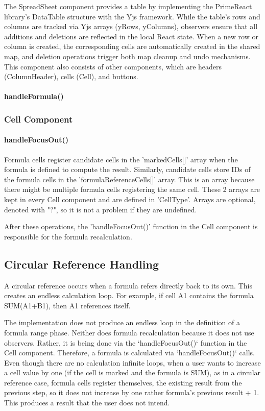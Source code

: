 \documentclass{article}
\begin{document}
The SpreadSheet component provides a table by implementing the PrimeReact library's DataTable structure with the Yjs framework. 
While the table's rows and columns are tracked via Yjs arrays (yRows, yColumns), 
observers ensure that all additions and deletions are reflected in the local React state. 
When a new row or column is created, the corresponding cells are automatically created in the shared map, 
and deletion operations trigger both map cleanup and undo mechanisms. 
This component also consists of other components, which are headers (ColumnHeader), cells (Cell), and buttons.

\paragraph{handleFormula()}

\subsubsection{Cell Component}

\paragraph{handleFocusOut()}

Formula cells register candidate cells in the 'markedCells[]' array when the formula is defined to compute the result. 
Similarly, candidate cells store IDs of the formula cells in the 'formulaReferenceCells[]' array. 
This is an array because there might be multiple formula cells registering the same cell. 
These 2 arrays are kept in every Cell component and are defined in 'CellType'. 
Arrays are optional, denoted with "?", so it is not a problem if they are undefined.

After these operations, the 'handleFocusOut()' function in the Cell component is responsible for the formula recalculation. 

\subsection{Circular Reference Handling}

A circular reference occurs when a formula refers directly back to its own. This creates an endless calculation loop. 
For example, if cell A1 contains the formula SUM(A1+B1), then A1 references itself. 

The implementation does not produce an endless loop in the definition of a formula range phase. 
Neither does formula recalculation because it does not use observers.
Rather, it is being done via the `handleFocusOut()` function in the Cell component.
Therefore, a formula is calculated via `handleFocusOut()` calls. 
Even though there are no calculation infinite loops, when a user wants to increase a cell value by one 
(if the cell is marked and the formula is SUM), as in a circular reference case, formula cells register themselves, 
the existing result from the previous step, so it does not increase by one rather formula's previous result + 1. 
This produces a result that the user does not intend.
\end{document}
